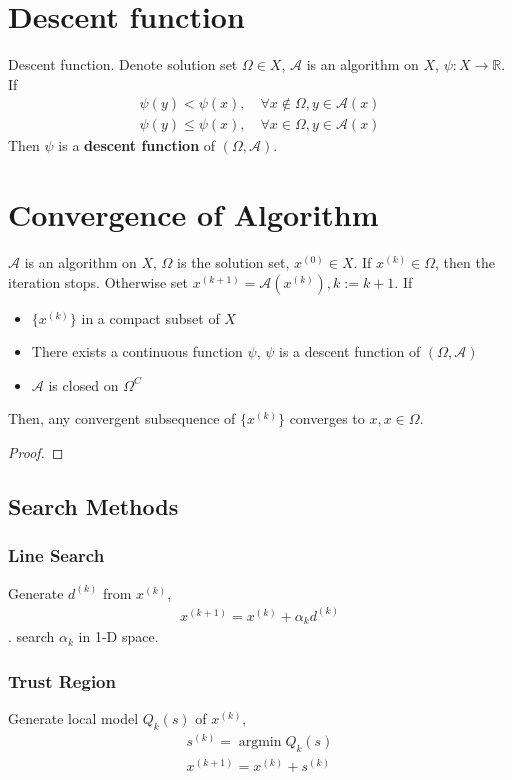 \section{Descent function}
\par
\begin{definition}{Descent function.}
    Denote solution set $\Omega \in X$, $\mathcal{A}$ is an
    algorithm on $X$, $\psi: X \rightarrow \mathbb{R}$.
    If
    \begin{align}
        \psi(y) < \psi(x),\quad \forall x \notin \Omega, y \in \mathcal{A}(x) \\
        \psi(y) \leq \psi(x),\quad \forall x \in \Omega, y \in \mathcal{A}(x)
    \end{align}
    Then $\psi$ is a \textbf{descent function} of $(\Omega, \mathcal{A})$.
\end{definition}
\section{Convergence of Algorithm}
\par
\begin{theorem}
    $\mathcal{A}$ is an algorithm on $X$,
    $\Omega$ is the solution set, $x^{(0)} \in X$.
    If $x^{(k)} \in \Omega$, then the iteration stops.
    Otherwise set $x^{(k+1)} = \mathcal{A}(x^{(k)}), k:=k+1$.
    If
    \begin{itemize}
        \item $\{x^{(k)}\}$ in a compact subset of $X$
        \item There exists a continuous function $\psi$,
         $\psi$ is a descent function of $(\Omega, \mathcal{A})$
        \item $\mathcal{A}$ is closed on $\Omega^C$
    \end{itemize}
    Then, any convergent subsequence of $\{x^{(k)}\}$ converges to 
    $x, x \in \Omega$.
\end{theorem}
\begin{proof}
    
\end{proof}

\subsection{Search Methods}
\subsubsection{Line Search}
\par
Generate $d^{(k)}$ from 
$x^{(k)}$, 
\begin{align}
    x^{(k+1)} = x^{(k)} + \alpha_kd^{(k)}
\end{align}.
search $\alpha_k$ in 1-D space.
\par
\subsubsection{Trust Region}
\par
Generate local model $Q_{k}(s)$ of $x^{(k)}$,
\begin{align}
    s^{(k)} = \mathop{\arg\min} Q_k(s) \\
    x^{(k+1)} = x^{(k)} + s^{(k)}
\end{align}
